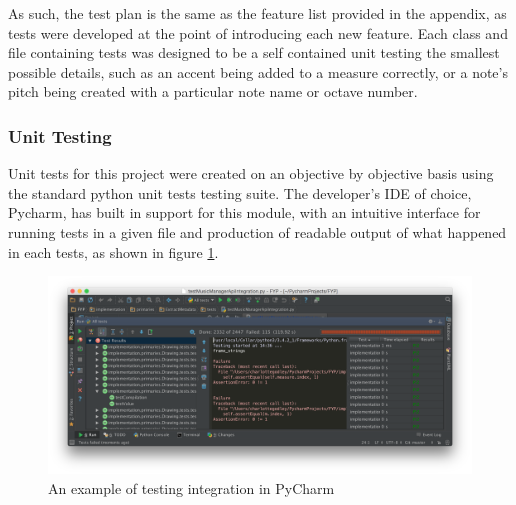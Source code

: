 As such, the test plan is the same as the feature list provided in the appendix, as tests were developed at the point of introducing each new feature. Each class and file containing tests was designed to be a self contained unit testing the smallest possible details, such as an accent being added to a measure correctly, or a note's pitch being created with a particular note name or octave number.

\subsubsection{Unit Testing}
Unit tests for this project were created on an objective by objective basis using the standard python unit tests testing suite. The developer's IDE of choice, Pycharm, has built in support for this module, with an intuitive interface for running tests in a given file and production of readable output of what happened in each tests, as shown in figure \ref{fig:testing_interface}.

\begin{figure}[h]
	\centering
	\includegraphics[width=\textwidth]{testing_interface}	
	\caption{An example of testing integration in PyCharm}
	\label{fig:testing_interface}
\end{figure}

